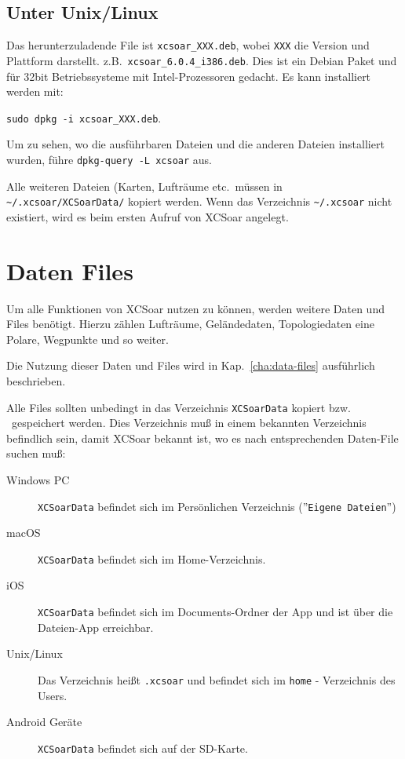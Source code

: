 \subsection*{Unter Unix/Linux}

Das herunterzuladende File ist \verb|xcsoar_XXX.deb|, wobei \verb|XXX| die Version und Plattform darstellt.  
z.B.\ \verb|xcsoar_6.0.4_i386.deb|. Dies ist ein Debian Paket und für 32bit Betriebssysteme mit Intel-Prozessoren gedacht.
Es kann installiert werden mit:
\begin{center}
\verb|sudo dpkg -i xcsoar_XXX.deb|.
\end{center}
Um zu sehen, wo die ausführbaren Dateien und die anderen Dateien installiert wurden, führe \verb|dpkg-query -L xcsoar| 
aus. 

Alle weiteren Dateien (Karten, Lufträume etc.\ müssen in \verb|~/.xcsoar/XCSoarData/| kopiert werden.
Wenn das Verzeichnis \verb|~/.xcsoar| nicht existiert, wird es beim ersten Aufruf von {\textsf  XCSoar} angelegt.


\section{Daten Files}\label{InstallationDatenfiles}

Um alle Funktionen von {\textsf  XCSoar} nutzen zu können, werden weitere Daten und Files benötigt.
Hierzu zählen Lufträume, Geländedaten, Topologiedaten eine Polare, Wegpunkte und so weiter. 


Die Nutzung dieser Daten und Files wird in Kap.~\ref{cha:data-files} ausführlich beschrieben. 

Alle Files sollten unbedingt in das Verzeichnis \texttt{XCSoarData} kopiert bzw. \ gespeichert werden. 
Dies Verzeichnis muß  in einem bekannten Verzeichnis befindlich sein, damit {\textsf  XCSoar} bekannt ist, wo es nach entsprechenden 
Daten-File suchen muß: 

 
\begin{description}
\item[Windows PC]
\texttt{XCSoarData} befindet sich im Persönlichen Verzeichnis (''\texttt{Eigene Dateien}'')
\item[macOS]
\texttt{XCSoarData} befindet sich im Home-Verzeichnis.
\item[iOS]
\texttt{XCSoarData} befindet sich im Documents-Ordner der App und ist
über die Dateien-App erreichbar.
\item[Unix/Linux]
Das Verzeichnis heißt \verb|.xcsoar| und befindet sich im \verb|home| - Verzeichnis des Users. 
\item[Android Geräte]
\texttt{XCSoarData} befindet sich auf der SD-Karte.
\end{description}



